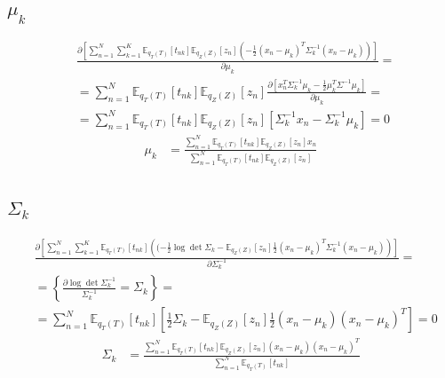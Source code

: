 \documentclass[12pt, a4paper]{article}
\begin{document}
        \subsection{$\mu_k$}
            \begin{align*}
                &\frac{\partial \left[\sum_{n=1}^{N}\sum_{k=1}^{K}\mathbb{E}_{q_T(T)}\left[t_{nk}\right]\mathbb{E}_{q_Z(Z)}\left[z_{n}\right]\left(-\frac{1}{2}(x_n - \mu_k)^T\Sigma_k^{-1}(x_n - \mu_k) \right)\right]}{\partial \mu_k} =\\
                & = \sum_{n=1}^{N}\mathbb{E}_{q_T(T)}\left[t_{nk}\right]\mathbb{E}_{q_Z(Z)}\left[z_{n}\right]\frac{\partial \left[x_n^T\Sigma_k^{-1}\mu_k -\frac{1}{2}\mu_k^T\Sigma^{-1}\mu_k\right]}{\partial \mu_k} =\\
                & = \sum_{n=1}^{N}\mathbb{E}_{q_T(T)}\left[t_{nk}\right]\mathbb{E}_{q_Z(Z)}\left[z_{n}\right]\left[\Sigma_k^{-1}x_n - \Sigma_k^{-1}\mu_k\right] = 0
            \end{align*}
            \begin{align}
                \mu_k & = \frac{\sum_{n=1}^{N}\mathbb{E}_{q_T(T)}\left[t_{nk}\right]\mathbb{E}_{q_Z(Z)}\left[z_{n}\right]x_n}{\sum_{n=1}^{N}\mathbb{E}_{q_T(T)}\left[t_{nk}\right]\mathbb{E}_{q_Z(Z)}\left[z_{n}\right]}
            \end{align}

        \subsection{$\Sigma_k$}
            \begin{align*}
                &\frac{\partial \left[\sum_{n=1}^{N}\sum_{k=1}^{K}\mathbb{E}_{q_T(T)}\left[t_{nk}\right]\left((-\frac{1}{2}\log\det{\Sigma_k} -\mathbb{E}_{q_Z(Z)}\left[z_{n}\right]\frac{1}{2}(x_n - \mu_k)^T\Sigma_k^{-1}(x_n - \mu_k) \right)\right]}{\partial \Sigma_k^{-1}} =\\ &=\left\{\frac{\partial  \log\det{\Sigma_k^{-1}}}{\Sigma_k^{-1}} = \Sigma_k\right\} = \\
                &= \sum_{n=1}^{N}\mathbb{E}_{q_T(T)}\left[t_{nk}\right]\left[\frac{1}{2}\Sigma_k - \mathbb{E}_{q_Z(Z)}\left[z_{n}\right]\frac{1}{2}(x_n - \mu_k)(x_n - \mu_k)^T\right] = 0
            \end{align*}
            \begin{align}
                \Sigma_k & =  \frac{\sum_{n=1}^{N}\mathbb{E}_{q_T(T)}\left[t_{nk}\right]\mathbb{E}_{q_Z(Z)}\left[z_{n}\right](x_n - \mu_k)(x_n - \mu_k)^T}{\sum_{n=1}^{N}\mathbb{E}_{q_T(T)}\left[t_{nk}\right]}
            \end{align}
\end{document}
